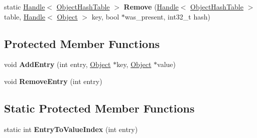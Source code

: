 \begin{DoxyCompactItemize}
\item 
static \hyperlink{classv8_1_1internal_1_1_handle}{Handle}$<$ \hyperlink{classv8_1_1internal_1_1_object_hash_table}{Object\+Hash\+Table} $>$ {\bfseries Remove} (\hyperlink{classv8_1_1internal_1_1_handle}{Handle}$<$ \hyperlink{classv8_1_1internal_1_1_object_hash_table}{Object\+Hash\+Table} $>$ table, \hyperlink{classv8_1_1internal_1_1_handle}{Handle}$<$ \hyperlink{classv8_1_1internal_1_1_object}{Object} $>$ key, bool $\ast$was\+\_\+present, int32\+\_\+t hash)\hypertarget{classv8_1_1internal_1_1_object_hash_table_a0445c6013e5dbc4dd742bea32744f881}{}\label{classv8_1_1internal_1_1_object_hash_table_a0445c6013e5dbc4dd742bea32744f881}

\end{DoxyCompactItemize}
\subsection*{Protected Member Functions}
\begin{DoxyCompactItemize}
\item 
void {\bfseries Add\+Entry} (int entry, \hyperlink{classv8_1_1internal_1_1_object}{Object} $\ast$key, \hyperlink{classv8_1_1internal_1_1_object}{Object} $\ast$value)\hypertarget{classv8_1_1internal_1_1_object_hash_table_a3284fedd077d14a7f22eca259497e9cb}{}\label{classv8_1_1internal_1_1_object_hash_table_a3284fedd077d14a7f22eca259497e9cb}

\item 
void {\bfseries Remove\+Entry} (int entry)\hypertarget{classv8_1_1internal_1_1_object_hash_table_ae1547c0e2dac808ff7162d0fa6b199c5}{}\label{classv8_1_1internal_1_1_object_hash_table_ae1547c0e2dac808ff7162d0fa6b199c5}

\end{DoxyCompactItemize}
\subsection*{Static Protected Member Functions}
\begin{DoxyCompactItemize}
\item 
static int {\bfseries Entry\+To\+Value\+Index} (int entry)\hypertarget{classv8_1_1internal_1_1_object_hash_table_ab8e3c2ab65d6e2e2b56df21732ae8bd5}{}\label{classv8_1_1internal_1_1_object_hash_table_ab8e3c2ab65d6e2e2b56df21732ae8bd5}

\end{DoxyCompactItemize}
